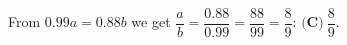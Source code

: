 From $0.99a=0.88b$ we get $\dfrac ab=\dfrac{0.88}{0.99}=\dfrac{88}{99}=\dfrac89$: $\boxed{\textbf{(C)}\ \dfrac89}$.
